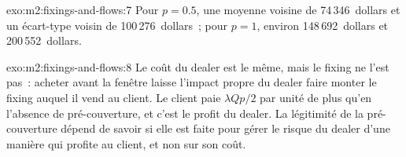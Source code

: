 \begin{solution}{exo:m2:fixings-and-flows:7}
Pour $p = 0.5$, une moyenne voisine de 74\,346~dollars et un écart-type voisin de
100\,276~dollars~; pour $p = 1$, environ 148\,692~dollars et 200\,552~dollars.
\end{solution}

\begin{solution}{exo:m2:fixings-and-flows:8}
Le coût du dealer est le même, mais le fixing ne l'est pas~: acheter avant la fenêtre laisse
l'impact propre du dealer faire monter le fixing auquel il vend au client. Le client
paie $\lambda Q p/2$ par unité de plus qu'en l'absence de pré-couverture, et c'est le
profit du dealer. La légitimité de la pré-couverture dépend de savoir si elle est faite
pour gérer le risque du dealer d'une manière qui profite au client, et non sur son coût.
\end{solution}

